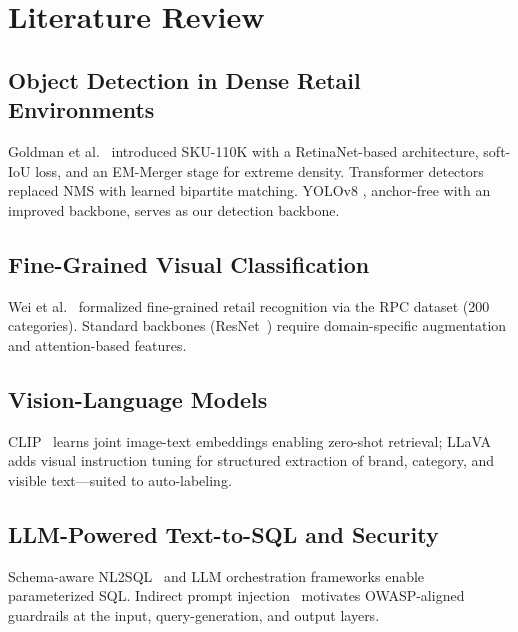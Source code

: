 \section{Literature Review}
\subsection{Object Detection in Dense Retail Environments}
Goldman et al.~\cite{goldman2019sku110k} introduced SKU-110K with a RetinaNet-based architecture,
soft-IoU loss, and an EM-Merger stage for extreme density. Transformer detectors
\cite{carion2020detr,zhu2021deformabledetr} replaced NMS with learned bipartite matching. YOLOv8
\cite{jocher2023yolov8}, anchor-free with an improved backbone, serves as our detection backbone.

\subsection{Fine-Grained Visual Classification}
Wei et al.~\cite{wei2019rpc} formalized fine-grained retail recognition via the RPC dataset
(200 categories). Standard backbones (ResNet~\cite{he2016resnet}) require domain-specific
augmentation and attention-based features.

\subsection{Vision-Language Models}
CLIP~\cite{radford2021clip} learns joint image-text embeddings enabling zero-shot retrieval;
LLaVA~\cite{liu2023llava} adds visual instruction tuning for structured extraction of brand,
category, and visible text---suited to auto-labeling.

\subsection{LLM-Powered Text-to-SQL and Security}
Schema-aware NL2SQL~\cite{lin2020bridge} and LLM orchestration frameworks enable parameterized SQL.
Indirect prompt injection~\cite{greshake2023injection} motivates OWASP-aligned guardrails at the
input, query-generation, and output layers.
